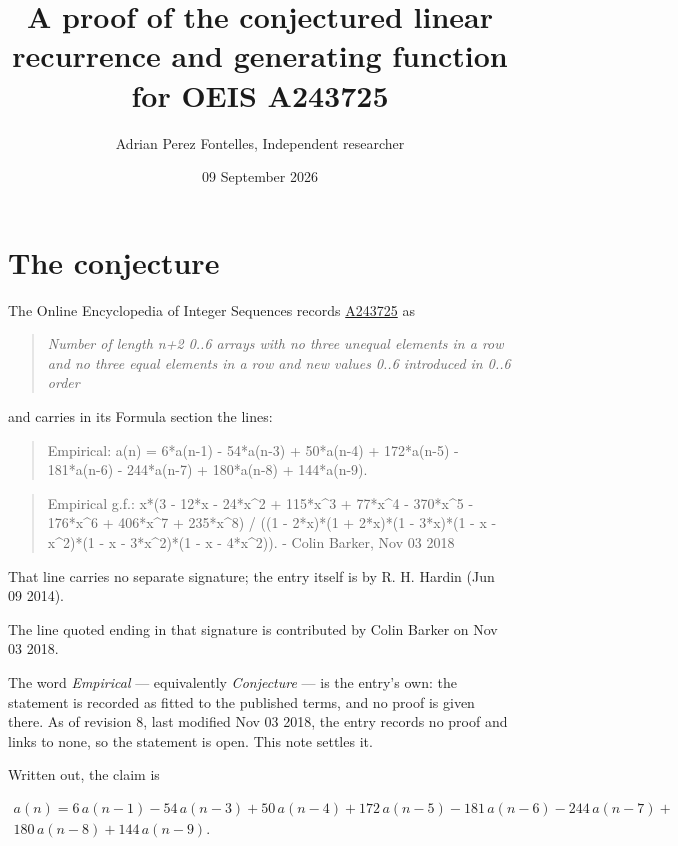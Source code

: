 \documentclass[11pt]{article}
\title{A proof of the conjectured linear recurrence and generating function for OEIS A243725}
\author{Adrian Perez Fontelles, Independent researcher}
\date{09 September 2026}
\theoremstyle{definition}
\begin{document}
\maketitle
\section{The conjecture}

The Online Encyclopedia of Integer Sequences records \href{https://oeis.org/A243725}{A243725} as

\begin{quote}\itshape Number of length n+2 0..6 arrays with no three unequal elements in a row and no three equal elements in a row and new values 0..6 introduced in 0..6 order\end{quote}

and carries in its Formula section the lines:

\begin{quote}\ttfamily Empirical: a(n) = 6*a(n-1) - 54*a(n-3) + 50*a(n-4) + 172*a(n-5) - 181*a(n-6) - 244*a(n-7) + 180*a(n-8) + 144*a(n-9).\end{quote}

\begin{quote}\ttfamily Empirical g.f.: x*(3 - 12*x - 24*x\textasciicircum{}2 + 115*x\textasciicircum{}3 + 77*x\textasciicircum{}4 - 370*x\textasciicircum{}5 - 176*x\textasciicircum{}6 + 406*x\textasciicircum{}7 + 235*x\textasciicircum{}8) / ((1 - 2*x)*(1 + 2*x)*(1 - 3*x)*(1 - x - x\textasciicircum{}2)*(1 - x - 3*x\textasciicircum{}2)*(1 - x - 4*x\textasciicircum{}2)). - Colin Barker, Nov 03 2018\end{quote}

That line carries no separate signature; the entry itself is by R. H. Hardin (Jun 09 2014).

The line quoted ending in that signature is contributed by Colin Barker on Nov 03 2018.

The word {\itshape Empirical} --- equivalently {\itshape Conjecture} --- is the entry's own: the statement is recorded as fitted to the published terms, and no proof is given there. As of revision 8, last modified Nov 03 2018, the entry records no proof and links to none, so the statement is open. This note settles it.

Written out, the claim is

\begin{multline*} a(n) = 6\,a(n-1) - 54\,a(n-3) + 50\,a(n-4) + 172\,a(n-5) - 181\,a(n-6) - 244\,a(n-7) + \\ 180\,a(n-8) + 144\,a(n-9). \end{multline*}
\end{document}
